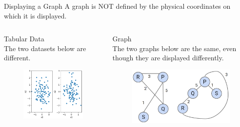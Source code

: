 \documentclass[aspectratio=169]{../latex_main/tntbeamer}  %
\begin{document}
	
	
	\begin{frame}{Displaying a Graph}
	    A graph is NOT defined by the physical coordinates on which it is displayed.
        \begin{columns}
            \begin{column}{.5\textwidth}
                    Tabular Data\\
                    The two datasets below are different.
                    \begin{figure}
                        \centering
                        \includegraphics[scale=.45]{Bild5}
                    \end{figure}
            \end{column}
            
            
            \begin{column}{.5\textwidth}
                Graph\\
                The two graphs below are the same, even though they are displayed differently.
                    \begin{figure}
                        \centering
                        \includegraphics[scale=.4]{Bild6}
                    \end{figure}
            \end{column}
        \end{columns}
	\end{frame}
	
\end{document}
